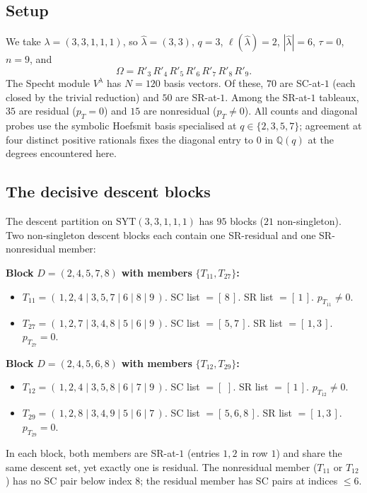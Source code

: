 \documentclass[11pt]{article}
\theoremstyle{definition}
\newcommand{\la}{\lambda}
\newcommand{\hla}{\hat{\lambda}}
\newcommand{\Om}{\Omega}
\newcommand{\SYT}{\mathrm{SYT}}
\begin{document}
\subsection{Setup}
We take $\la = (3, 3, 1, 1, 1)$, so $\hla = (3, 3)$, $q = 3$,
$\ell(\hla) = 2$, $|\hla| = 6$, $\tau = 0$, $n = 9$, and
\[
\Om = R'_3\, R'_4\, R'_5\, R'_6\, R'_7\, R'_8\, R'_9.
\]
The Specht module $V^\la$ has $N = 120$ basis vectors. Of these,
$70$ are SC-at-$1$ (each closed by the trivial reduction) and $50$
are SR-at-$1$. Among the SR-at-$1$ tableaux, $35$ are residual
($p_T = 0$) and $15$ are nonresidual ($p_T \ne 0$). All counts and
diagonal probes use the symbolic Hoefsmit basis specialised at
$q \in \{2, 3, 5, 7\}$; agreement at four distinct positive rationals
fixes the diagonal entry to $0$ in $\mathbb{Q}(q)$ at the degrees
encountered here.

\subsection{The decisive descent blocks}
The descent partition on $\SYT(3,3,1,1,1)$ has $95$ blocks ($21$
non-singleton). Two non-singleton descent blocks each contain one
SR-residual and one SR-nonresidual member:

\medskip
\noindent\textbf{Block } $D = (2, 4, 5, 7, 8)$ \textbf{ with members}
$\{T_{11}, T_{27}\}$\textbf{:}
\begin{itemize}
\item $T_{11} = (\,1,2,4 \mid 3,5,7 \mid 6 \mid 8 \mid 9\,)$. SC list
$= [\,8\,]$. SR list $= [\,1\,]$. $p_{T_{11}} \ne 0$.
\item $T_{27} = (\,1,2,7 \mid 3,4,8 \mid 5 \mid 6 \mid 9\,)$. SC list
$= [\,5, 7\,]$. SR list $= [\,1, 3\,]$. $p_{T_{27}} = 0$.
\end{itemize}

\noindent\textbf{Block } $D = (2, 4, 5, 6, 8)$ \textbf{ with members}
$\{T_{12}, T_{29}\}$\textbf{:}
\begin{itemize}
\item $T_{12} = (\,1,2,4 \mid 3,5,8 \mid 6 \mid 7 \mid 9\,)$. SC list
$= [\,\,]$. SR list $= [\,1\,]$. $p_{T_{12}} \ne 0$.
\item $T_{29} = (\,1,2,8 \mid 3,4,9 \mid 5 \mid 6 \mid 7\,)$. SC list
$= [\,5, 6, 8\,]$. SR list $= [\,1, 3\,]$. $p_{T_{29}} = 0$.
\end{itemize}

\medskip
In each block, both members are SR-at-$1$ (entries $1, 2$ in row $1$)
and share the same descent set, yet exactly one is residual. The
nonresidual member ($T_{11}$ or $T_{12}$) has no SC pair below index
$8$; the residual member has SC pairs at indices $\le 6$.
\end{document}
